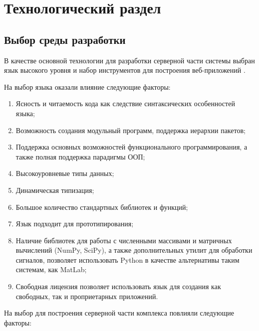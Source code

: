 \chapter{Технологический раздел}
\section{Выбор среды разработки}

В качестве основной технологии для разработки серверной части системы выбран
язык высокого уровня  и набор инструментов для построения веб-приложений
.

На выбор языка оказали влияние следующие факторы:

\begin{enumerate}
\item Ясность и читаемость кода как следствие синтаксических особенностей языка;
\item Возможность создания модульный программ, поддержка иерархии пакетов;
\item Поддержка основных возможностей функционального программирования, а также
полная поддержка парадигмы ООП;
\item Высокоуровневые типы данных;
\item Динамическая типизация;
\item Большое количество стандартных библиотек и функций;
\item Язык подходит для прототипирования;
\item Наличие библиотек для работы с численными массивами и матричных вычислений
(NumPy, SciPy), а также дополнительных утилит для обработки сигналов, позволяет
использовать Python в качестве альтернативы таким системам, как MatLab;
\item Свободная лицензия позволяет использовать язык для создания как свободных,
так и проприетарных приложений.
\end{enumerate}

На выбор  для построения серверной части комплекса повлияли
следующие факторы:

